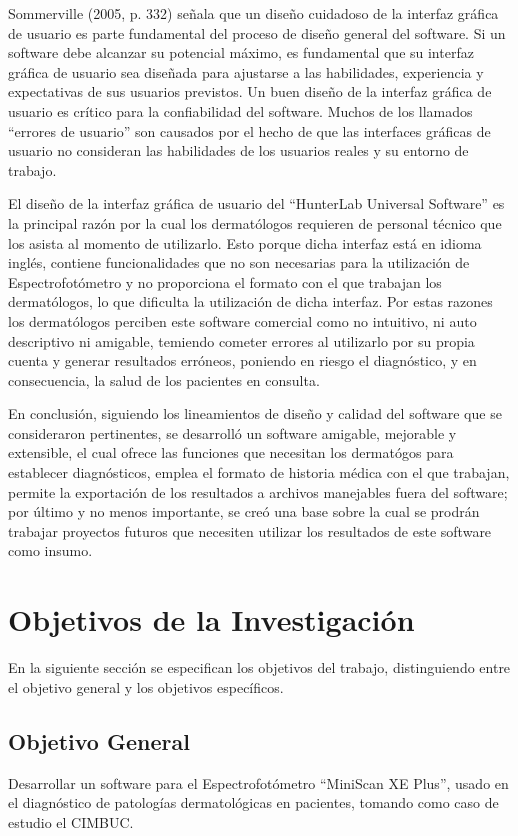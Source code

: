 Sommerville (2005, p. 332) se\~{n}ala que un dise\~{n}o cuidadoso de la interfaz gr\'{a}fica de usuario es parte fundamental del proceso de dise\~{n}o general del software. Si un software debe alcanzar su potencial m\'{a}ximo, es fundamental que su interfaz gr\'{a}fica de usuario sea dise\~{n}ada para ajustarse a las habilidades, experiencia y expectativas de sus usuarios previstos. Un buen dise\~{n}o de la interfaz gr\'{a}fica de usuario es cr\'{i}tico para la confiabilidad del software. Muchos de los llamados ``errores de usuario'' son causados por el hecho de que las interfaces gr\'{a}ficas de usuario no consideran las habilidades de los usuarios reales y su entorno de trabajo.

El dise\~{n}o de la interfaz gr\'{a}fica de usuario del ``HunterLab Universal Software'' es la principal raz\'{o}n por la cual los dermat\'{o}logos requieren de personal t\'{e}cnico que los asista al momento de utilizarlo. Esto porque dicha interfaz est\'{a} en idioma ingl\'{e}s, contiene funcionalidades que no son necesarias para la utilizaci\'{o}n de Espectrofot\'{o}metro y no proporciona el formato con el que trabajan los dermat\'{o}logos, lo que dificulta la utilizaci\'{o}n de dicha interfaz. Por estas razones los dermat\'{o}logos perciben este software comercial como no intuitivo, ni auto descriptivo ni amigable, temiendo cometer errores al utilizarlo por su propia cuenta y generar resultados err\'{o}neos, poniendo en riesgo el diagn\'{o}stico, y en consecuencia, la salud de los pacientes en consulta.

En conclusi\'{o}n, siguiendo los lineamientos de dise\~{n}o y calidad del software que se consideraron pertinentes, se desarroll\'{o} un software amigable, mejorable y extensible, el cual ofrece las funciones que necesitan los dermat\'{o}gos para establecer diagn\'{o}sticos, emplea el formato de historia m\'{e}dica con el que trabajan, permite la exportaci\'{o}n de los resultados a archivos manejables fuera del software; por \'{u}ltimo y no menos importante, se cre\'{o} una base sobre la cual se prodr\'{a}n trabajar proyectos futuros que necesiten utilizar los resultados de este software como insumo.
	\newpage

	\section{Objetivos de la Investigaci\'{o}n}
En la siguiente secci\'{o}n se especifican los objetivos del trabajo, distinguiendo entre el objetivo general y los objetivos espec\'{i}ficos.
		\subsection{Objetivo General}
	Desarrollar un software para el Espectrofot\'{o}metro ``MiniScan XE Plus'', usado en el diagn\'{o}stico de patolog\'{i}as dermatol\'{o}gicas en pacientes, tomando como caso de estudio el CIMBUC.
